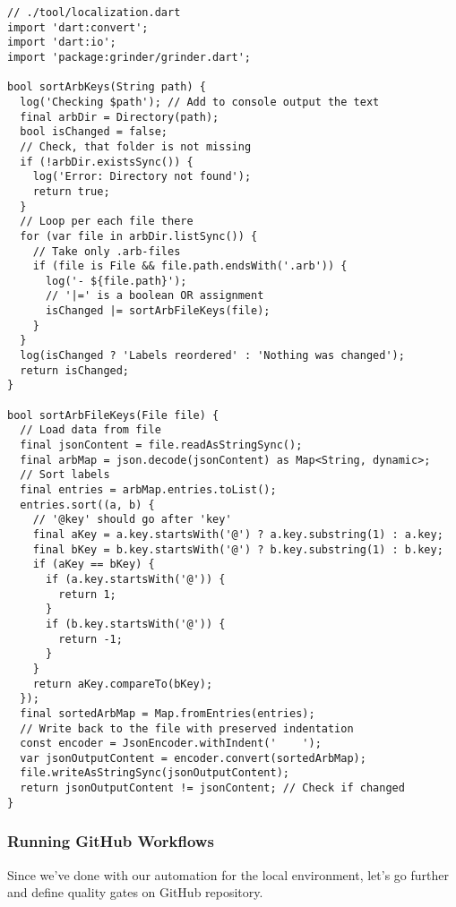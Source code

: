 \begin{lstlisting}
// ./tool/localization.dart
import 'dart:convert';
import 'dart:io';
import 'package:grinder/grinder.dart';

bool sortArbKeys(String path) {
  log('Checking $path'); // Add to console output the text
  final arbDir = Directory(path);
  bool isChanged = false;
  // Check, that folder is not missing
  if (!arbDir.existsSync()) {
    log('Error: Directory not found');
    return true;
  }
  // Loop per each file there
  for (var file in arbDir.listSync()) {
    // Take only .arb-files
    if (file is File && file.path.endsWith('.arb')) {
      log('- ${file.path}');
      // '|=' is a boolean OR assignment
      isChanged |= sortArbFileKeys(file);
    }
  }
  log(isChanged ? 'Labels reordered' : 'Nothing was changed');
  return isChanged;
}

bool sortArbFileKeys(File file) {
  // Load data from file
  final jsonContent = file.readAsStringSync();
  final arbMap = json.decode(jsonContent) as Map<String, dynamic>;
  // Sort labels
  final entries = arbMap.entries.toList();
  entries.sort((a, b) {
    // '@key' should go after 'key'
    final aKey = a.key.startsWith('@') ? a.key.substring(1) : a.key;
    final bKey = b.key.startsWith('@') ? b.key.substring(1) : b.key;
    if (aKey == bKey) {
      if (a.key.startsWith('@')) {
        return 1;
      }
      if (b.key.startsWith('@')) {
        return -1;
      }
    }
    return aKey.compareTo(bKey);
  });
  final sortedArbMap = Map.fromEntries(entries);
  // Write back to the file with preserved indentation
  const encoder = JsonEncoder.withIndent('    ');
  var jsonOutputContent = encoder.convert(sortedArbMap);
  file.writeAsStringSync(jsonOutputContent);
  return jsonOutputContent != jsonContent; // Check if changed
}
\end{lstlisting}


\subsubsection{Running GitHub Workflows}

Since we've done with our automation for the local environment, let's go further and define quality gates on GitHub 
repository.

